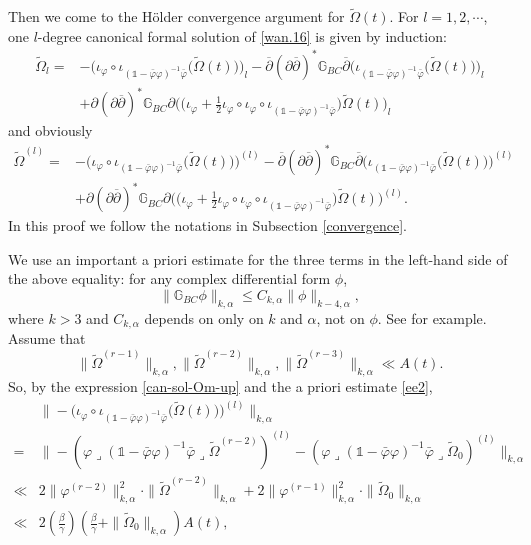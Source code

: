 \documentclass[12pt]{amsart}
\numberwithin{equation}{section}
\renewcommand{\1}{\mathds{1}}
\newcommand{\G}{\mathbb{G}}
\newcommand{\db}{\overline{\partial}}
\newcommand{\lc}{\lrcorner}
\renewcommand{\>}{\rightarrow}
\newcommand{\p}{\partial}
\def\p{\partial}
\def\b{\bar}
\begin{document}
Then we come to the  H\"older  convergence argument for $\tilde{\Omega}(t)$.
For $l=1,2,\cdots$, one $l$-degree canonical formal solution of
\eqref{wan.16} is given by induction:
\begin{equation}\label{can-sol-Om}
\begin{aligned}
\tilde{\Omega}_l
 =&-\Big( \iota_{\varphi}\circ
\iota_{(\1-\b{\varphi}\varphi)^{-1}\b{\varphi}} \big(
\tilde{\Omega}(t)\big) \Big)_l -\db (\p\db)^* \G_{BC} \db  \Big(
\iota_{(\1-\b{\varphi}\varphi)^{-1}\b{\varphi}} \big(
\tilde{\Omega}(t) \big) \Big)_l\\
& + \p (\p\db)^* \G_{BC} \p \Big( \big( \iota_{\varphi}+ \frac{1}{2}
\iota_{\varphi}\circ \iota_{\varphi}\circ
\iota_{(\1-\b{\varphi}\varphi)^{-1}\b{\varphi}}\big)\tilde{\Omega}(t)
\Big)_l
\end{aligned}
\end{equation}
and obviously
\begin{equation}\label{can-sol-Om-up}
\begin{aligned}
\tilde{\Omega}^{(l)}
 =&-\Big( \iota_{\varphi}\circ
\iota_{(\1-\b{\varphi}\varphi)^{-1}\b{\varphi}} \big(
\tilde{\Omega}(t)\big) \Big)^{(l)} -\db (\p\db)^* \G_{BC} \db  \Big(
\iota_{(\1-\b{\varphi}\varphi)^{-1}\b{\varphi}} \big(
\tilde{\Omega}(t) \big) \Big)^{(l)}\\
& + \p (\p\db)^* \G_{BC} \p \Big( \big( \iota_{\varphi}+ \frac{1}{2}
\iota_{\varphi}\circ \iota_{\varphi}\circ
\iota_{(\1-\b{\varphi}\varphi)^{-1}\b{\varphi}}\big)\tilde{\Omega}(t)
\Big)^{(l)}.
\end{aligned}
\end{equation}
In this proof we follow the notations in Subsection \ref{convergence}.


We use an important a priori estimate for the three terms in the
left-hand side of the above equality: for any complex differential
form $\phi$,
\begin{equation}\label{ee2}
\|\G_{BC}\phi\|_{k, \alpha}\leq C_{k,\alpha}\|\phi\|_{k-4, \alpha},
\end{equation}
where $k>3$ and $C_{k,\alpha}$ depends on only on $k$ and $\alpha$,
not on $\phi$. See \cite[Appendix.Theorem $7.4$]{k} for example. Assume
that
$$\|\tilde{\Omega}^{(r-1)}\|_{k, \alpha},\|\tilde{\Omega}^{(r-2)}\|_{k, \alpha},\|\tilde{\Omega}^{(r-3)}\|_{k, \alpha}\ll
A(t).$$ So, by the expression \eqref{can-sol-Om-up} and the a priori
estimate \eqref{ee2},
\begin{align*}
   &\|-\Big( \iota_{\varphi}\circ
\iota_{(\1-\b{\varphi}\varphi)^{-1}\b{\varphi}} \big(
\tilde{\Omega}(t)\big) \Big)^{(l)}\|_{k, \alpha}\\
=&\|-(\varphi\lc(\1-\b{\varphi}\varphi)^{-1}\b{\varphi}\lc\tilde{\Omega}^{(r-2)})^{(l)}
-(\varphi\lc(\1-\b{\varphi}\varphi)^{-1}\b{\varphi}\lc\tilde{\Omega}_0)^{(l)}\|_{k, \alpha}\\
 \ll & 2\|\varphi^{(r-2)}\|_{k, \alpha}^2\cdot
\|\tilde{\Omega}^{(r-2)}\|_{k, \alpha}+2\|\varphi^{(r-1)}\|_{k,
\alpha}^2\cdot
\|\tilde{\Omega}_0\|_{k, \alpha}\\
\ll &
2\left(\frac{\beta}{\gamma}\right)\left(\frac{\beta}{\gamma}+\|\tilde{\Omega}_0\|_{k,
\alpha}\right)A(t),
\end{align*}
\end{document}
